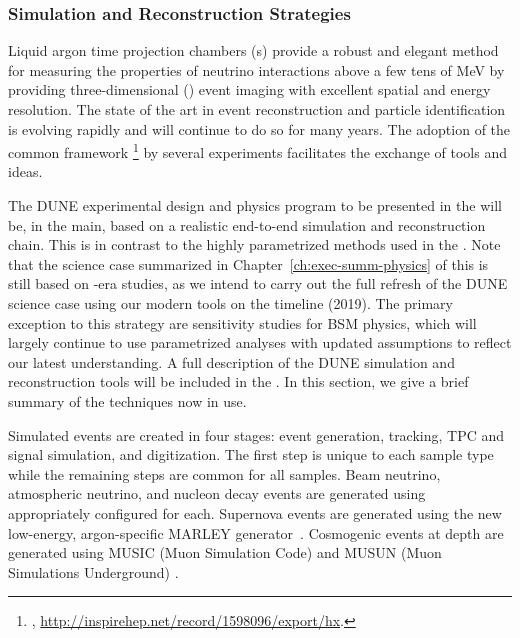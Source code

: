 \subsubsection{Simulation and Reconstruction Strategies}
\label{sec:exec-summ-strat-simreco}

Liquid argon time projection chambers (\lartpc{}s) provide a robust and elegant method for measuring the properties of neutrino interactions above a few tens of MeV by providing three-dimensional (\threed) event imaging with excellent spatial and energy resolution.  The state of the art in \lartpc event reconstruction and particle identification is evolving rapidly and will continue to do so for many years.  The adoption of the common framework \larsoft{}\footnote{\larsoft, \url{http://inspirehep.net/record/1598096/export/hx}.} by several \lartpc experiments facilitates the exchange of tools and ideas.

The DUNE experimental design and physics program to be presented in the  will be, in the main, based on a realistic end-to-end simulation and reconstruction chain.  This is in contrast to the highly parametrized methods used in the .  Note that the science case summarized in Chapter~\ref{ch:exec-summ-physics} of this  is still based on -era studies, as we intend to carry out the full refresh of the DUNE science case using our modern tools on the  timeline (2019).  The primary exception to this strategy are sensitivity studies for BSM physics, which will largely continue to use parametrized analyses with updated assumptions to reflect our latest understanding.  A full description of the DUNE simulation and reconstruction tools will be included in the .  In this section, we give a brief summary of the techniques now in use.

Simulated events are created in four stages: event generation,  tracking, TPC and  signal simulation, and digitization.  The first step is unique to each sample type while the remaining steps are common for all samples. Beam neutrino, atmospheric neutrino, and nucleon decay events are generated using  appropriately configured for each.  Supernova events are generated using the new low-energy, argon-specific MARLEY generator~\cite{marley}.  Cosmogenic events at depth are generated using MUSIC (Muon Simulation Code) \cite{MUSICPaper} and MUSUN (Muon Simulations Underground) \cite{Kudryavtsev:musun}.

